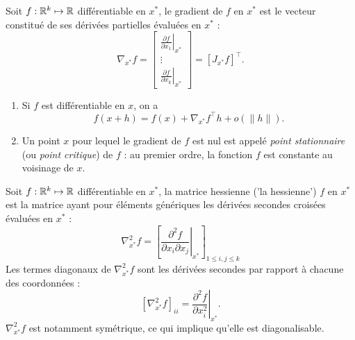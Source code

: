 \begin{definition}[Gradient]
  Soit $f : \mathbb{R}^k \mapsto \mathbb{R}$ différentiable en $x^*$, le gradient de $f$ en $x^*$ est le vecteur constitué de ses dérivées partielles évaluées en $x^*$ : 
  $$
  \nabla_{x^*}f 
  = \left[\begin{array}{c}
              \displaystyle{\left.\frac{\partial f}{\partial x_1}\right|_{x^*}}  \\
              \vdots \\
              \displaystyle{\left.\frac{\partial f}{\partial x_k}\right|_{x^*}} 
             \end{array}\right]
  = \left[J_{x^*} f\right]^\top.
  $$
\end{definition}

\remark
\begin{enumerate}
  \item Si $f$ est différentiable en $x$, on a
  $$
  f(x + h) = f(x) + \nabla_{x^*}f^\top h + o(\|h\|).
  $$
  \item Un point $x$ pour lequel le gradient de $f$ est nul est appelé {\em point stationnaire} (ou {\em point critique}) de $f$ : au premier ordre, la fonction $f$ est constante au voisinage de $x$.
\end{enumerate}


\begin{definition}
  Soit $f : \mathbb{R}^k \mapsto \mathbb{R}$ différentiable en $x^*$, la matrice hessienne ('la hessienne') $f$ en $x^*$ est la matrice ayant pour éléments génériques les dérivées secondes croisées évaluées en $x^*$ : 
  $$
  \nabla^2_{x^*}f 
  = \left[\left.\frac{\partial^2 f}{\partial x_i\partial x_j}\right|_{x^*} \right]_{1 \leq i, j \leq k}
  $$
  Les termes diagonaux de $\nabla^2_{x^*}f$ sont les dérivées secondes par rapport à chacune des coordonnées : 
  $$
  \left[ \nabla^2_{x^*}f \right]_{ii} 
  = \left.\frac{\partial^2 f}{\partial x_i^2}\right|_{x^*}.
  $$
  $\nabla^2_{x^*}f$ est notamment symétrique, ce qui implique qu'elle est diagonalisable.
\end{definition}

